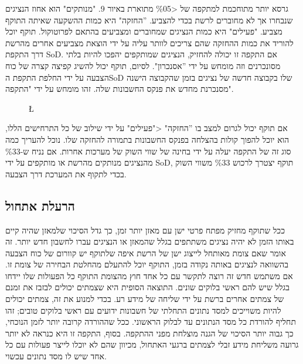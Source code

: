 גרסא יותר מתוחכמת למתקפה של \textless \%05 מתוארת באיור 9. "מנותקים" הוא אחוז הנציגים שנבחרו אך לא מחוברים לרשת בכדי להצביע. ''החזקה" היא כמות ההשקעה שאיתה התוקף מצביע. "פעילים" היא כמות הנציגים שמחוברים ומצביעים בהתאם לפרוטוקול. תוקף יוכל להוריד את כמות ההחזקה שהם צריכים לוותר עליה על ידי הוצאת מצביעים אחרים מהרשת דרך התקפת SoD. אם התקפה זו יכולה להחזיק, הנציגים שמותקפים יהפכו להיות בלתי מסונכרנים וזה מומחש על ידי ''אסנכרון". לסיום, תוקף יכול להשיג קפיצה קצרה של כוח הצבעה על ידי החלפת התקפת הSoD שלו בקבוצה חדשה של נציגים בזמן שהקבוצה הישנה מסנכרנת מחדש את פנקס החשבונות שלה. זהו מומחש על ידי "התקפה".
\begin{figure}[!h]
\L{
  \centering
    \label{fig:attack_dist}
  }
\end{figure}

אם תוקף יכול לגרום למצב בו ''החזקה" \textless  "פעילים" על ידי שילוב של כל התרחישים הללו, הוא יוכל להפוך קולות בהצלחה בפנקס החשבונות בתמורה להחזקה שלו. נוכל להעריך כמה סוג זה של התקפה יעלה על ידי בחינה של שווי השוק של מערכות אחרות. אם נניח ש-\%33 מהנציגים מנותקים מהרשת או מותקפים על ידי SoD, תוקף יצטרך לרכוש \%33 משווי השוק בכדי לתקוף את המערכת דרך הצבעה.

\subsection{הרעלת אתחול}
ככל שתוקף מחזיק מפתח פרטי ישן עם מאזן יותר זמן, כך גדל הסיכוי שלמאזן שהיה קיים באותו הזמן לא יהיה נציגים משתתפים בגלל שהמאזן או הנציגים עברו לחשבון חדש יותר. זה אומר שאם צומת מאותחל לייצוג ישן של הרשת איפה שלתוקף יש קוורום של כוח הצבעה בהשוואה לנציגים באותה נקודה בזמן, התוקף יוכל להתעלם מהחלטת הבחירה של צומת זו. אם משתמש חדש זה רוצה לתקשר עם כל אחד חוץ מהצומת התוקף כל הפעולות שלו יידחו בגלל שיש להם ראשי בלוקים שונים. התוצאה הסופית היא שצמתים יכולים לבזבז את זמנם של צמתים אחרים ברשת על ידי שליחה של מידע רע. בכדי למנוע את זה, צמתים יכולים להיות משוייכים למסד נתונים התחלתי של חשבונות ידועים עם ראשי בלוקים טובים; זהו תחליף להורדת כל מסד הנתונים עד לבלוק הראשוני. ככל שההורדה קרובה יותר לזמן הנוכחי, כך גבוה יותר הסיכוי של הגנה מוצלחת מפני ההתקפה. בסוף, התקפה זו היא כנראה לא יותר גרועה משליחת מידע זבלי לצמתים ברגעי האתחול, מכיוון שהם לא יוכלו לייצר פעולות עם כל אחד שיש לו מסד נתונים עכשוי.